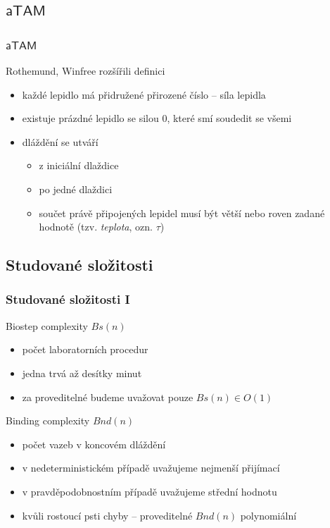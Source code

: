 \documentclass[10pt]{beamer}
\newcommand{\atam}{\mathsf{aTAM}}
\theoremstyle{definition}
\theoremstyle{remark}
\begin{document}
\subsection{$\atam$}
\begin{frame}
\frametitle{$\atam$}
	Rothemund, Winfree rozšířili definici
	\begin{itemize}
		\item každé lepidlo má přidružené přirozené číslo -- síla lepidla
		\item existuje prázdné lepidlo se silou 0, které smí soudedit se všemi
		\item dláždění se utváří
		\begin{itemize}
			\item z iniciální dlaždice
			\item po jedné dlaždici
			\item součet právě připojených lepidel musí být větší nebo roven zadané hodnotě (tzv. {\em teplota}, ozn. $\tau$)
		\end{itemize}
	\end{itemize}
\end{frame}

\subsection{Studované složitosti}
\begin{frame}
\frametitle{Studované složitosti I}
	Biostep complexity $Bs(n)$
	\begin{itemize}
		\item počet laboratorních procedur
		\item jedna trvá až desítky minut
		\item za proveditelné budeme uvažovat pouze $Bs(n) \in O(1)$
	\end{itemize}
	Binding complexity $Bnd(n)$
	\begin{itemize}
		\item počet vazeb v koncovém dláždění
		\item v nedeterministickém případě uvažujeme nejmenší přijímací
		\item v pravděpodobnostním případě uvažujeme střední hodnotu
		\item kvůli rostoucí psti chyby -- proveditelné $Bnd(n)$ polynomiální
	\end{itemize}
\end{frame}
\end{document}
